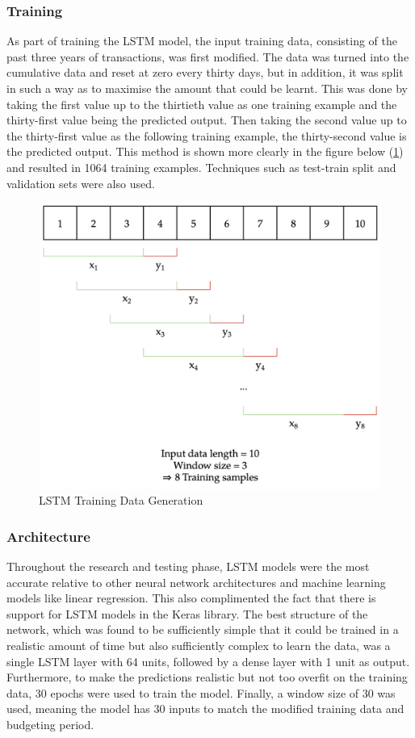 \subsubsection{Training}
As part of training the LSTM model, the input training data, consisting of the past three years of transactions, was first modified. The data was turned into the cumulative data and reset at zero every thirty days, but in addition, it was split in such a way as to maximise the amount that could be learnt. This was done by taking the first value up to the thirtieth value as one training example and the thirty-first value being the predicted output. Then taking the second value up to the thirty-first value as the following training example, the thirty-second value is the predicted output. This method is shown more clearly in the figure below (\ref{fig:TrainingData}) and resulted in 1064 training examples. Techniques such as test-train split and validation sets were also used.

\begin{figure}[H]
	\centering
	\includegraphics[width=\textwidth]{images/rnn_sample_generation.png}
	\caption{LSTM Training Data Generation}
	\label{fig:TrainingData}
\end{figure}

\subsubsection{Architecture}
Throughout the research and testing phase, LSTM models were the most accurate relative to other neural network architectures and machine learning models like linear regression. This also complimented the fact that there is support for LSTM models in the Keras library. The best structure of the network, which was found to be sufficiently simple that it could be trained in a realistic amount of time but also sufficiently complex to learn the data, was a single LSTM layer with 64 units, followed by a dense layer with 1 unit as output. Furthermore, to make the predictions realistic but not too overfit on the training data, 30 epochs were used to train the model. Finally, a window size of 30 was used, meaning the model has 30 inputs to match the modified training data and budgeting period.

